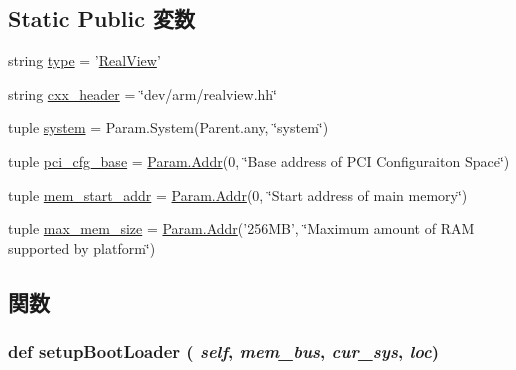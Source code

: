 \subsection*{Static Public 変数}
\begin{DoxyCompactItemize}
\item 
string \hyperlink{classRealView_1_1RealView_acce15679d830831b0bbe8ebc2a60b2ca}{type} = '\hyperlink{classRealView_1_1RealView}{RealView}'
\item 
string \hyperlink{classRealView_1_1RealView_a17da7064bc5c518791f0c891eff05fda}{cxx\_\-header} = \char`\"{}dev/arm/realview.hh\char`\"{}
\item 
tuple \hyperlink{classRealView_1_1RealView_ab737471139f5a296e5b26e8a0e1b0744}{system} = Param.System(Parent.any, \char`\"{}system\char`\"{})
\item 
tuple \hyperlink{classRealView_1_1RealView_ae33825da8d9785badce3e6a89e61b1fe}{pci\_\-cfg\_\-base} = \hyperlink{base_2types_8hh_af1bb03d6a4ee096394a6749f0a169232}{Param.Addr}(0, \char`\"{}Base address of PCI Configuraiton Space\char`\"{})
\item 
tuple \hyperlink{classRealView_1_1RealView_affd713b1717e14a6268fd6dd5c1c695f}{mem\_\-start\_\-addr} = \hyperlink{base_2types_8hh_af1bb03d6a4ee096394a6749f0a169232}{Param.Addr}(0, \char`\"{}Start address of main memory\char`\"{})
\item 
tuple \hyperlink{classRealView_1_1RealView_af983c75b7dafe291aeab929eb0dc7656}{max\_\-mem\_\-size} = \hyperlink{base_2types_8hh_af1bb03d6a4ee096394a6749f0a169232}{Param.Addr}('256MB', \char`\"{}Maximum amount of RAM supported by platform\char`\"{})
\end{DoxyCompactItemize}


\subsection{関数}
\hypertarget{classRealView_1_1RealView_a2bb8c2dabea2e4801ca416188787ef11}{
\subsubsection[{setupBootLoader}]{\setlength{\rightskip}{0pt plus 5cm}def setupBootLoader ( {\em self}, \/   {\em mem\_\-bus}, \/   {\em cur\_\-sys}, \/   {\em loc})}}
\label{classRealView_1_1RealView_a2bb8c2dabea2e4801ca416188787ef11}


